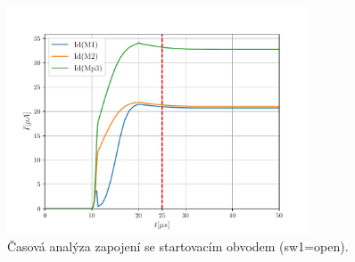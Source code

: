 \begin{figure}[h!]
    \centering
    \includegraphics[width=0.8\textwidth]{img/3-1-6.pdf}
    \caption{Časová analýza zapojení se startovacím obvodem (sw1=open).}
    \label{fig:img/3-1-6.pdf}
\end{figure}